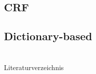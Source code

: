 \documentclass[12pt]{beamer}
\begin{document}
\subsection{CRF}
\begin{frame}

\end{frame}

\subsection{Dictionary-based}
\begin{frame}

\end{frame}


\section{}
\begin{frame}[t,allowframebreaks]{Literaturverzeichnis}
	\printbibliography[heading=none]
\end{frame}
\end{document}

